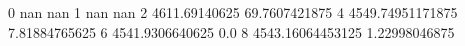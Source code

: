 0 nan nan
1 nan nan
2 4611.69140625 69.7607421875
4 4549.74951171875 7.81884765625
6 4541.9306640625 0.0
8 4543.16064453125 1.22998046875
